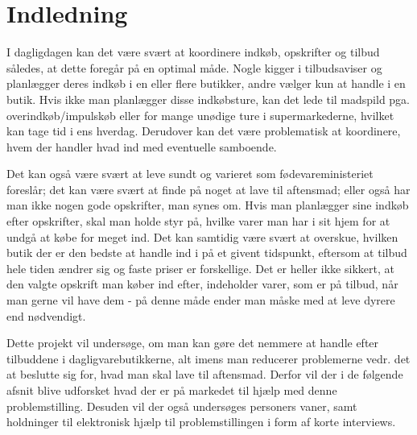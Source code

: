 \chapter{Indledning}\label{chapter:indledning}

I dagligdagen kan det være svært at koordinere indkøb, opskrifter og tilbud således, at dette foregår på en optimal måde. Nogle kigger i tilbudsaviser og planlægger deres indkøb i en eller flere butikker, andre vælger kun at handle i en butik. Hvis ikke man planlægger disse indkøbsture, kan det lede til madspild pga. overindkøb/impulskøb eller for mange unødige ture i supermarkederne, hvilket kan tage tid i ens hverdag. Derudover kan det være problematisk at koordinere, hvem der handler hvad ind med eventuelle samboende.  

Det kan også være svært at leve sundt og varieret som fødevareministeriet foreslår; det kan være svært at finde på noget at lave til aftensmad; eller også har man ikke nogen gode opskrifter, man synes om. 
Hvis man planlægger sine indkøb efter opskrifter, skal man holde styr på, hvilke varer man har i sit hjem for at undgå at købe for meget ind. Det kan samtidig være svært at overskue, hvilken butik der er den bedste at handle ind i på et givent tidspunkt, eftersom at tilbud hele tiden ændrer sig og faste priser er forskellige. Det er heller ikke sikkert, at den valgte opskrift man køber ind efter, indeholder varer, som er på tilbud, når man gerne vil have dem - på denne måde ender man måske med at leve dyrere end nødvendigt. 

Dette projekt vil undersøge, om man kan gøre det nemmere at handle efter tilbuddene i dagligvarebutikkerne, alt imens man reducerer problemerne vedr. det at beslutte sig for, hvad man skal lave til aftensmad. 
Derfor vil der i de følgende afsnit blive udforsket hvad der er på markedet til hjælp med denne problemstilling. Desuden vil der også undersøges personers vaner, samt holdninger til elektronisk hjælp til problemstillingen i form af korte interviews.
